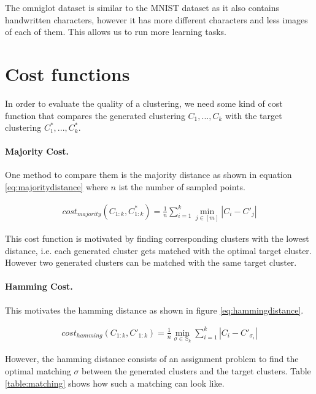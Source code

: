 The omniglot dataset is similar to the MNIST dataset as it also contains handwritten characters, however it has more different characters and less images of each of them. This allows us to run more learning tasks.

\section{Cost functions}
\label{chapter:costfunctions}

In order to evaluate the quality of a clustering, we need some kind of cost function that compares the generated clustering $C_1,...,C_k$ with the target clustering $C_1^*, ..., C_k^*$. 

\paragraph{Majority Cost.} One method to compare them is the majority distance as shown in equation \ref{eq:majoritydistance} where $n$ ist the number of sampled points.

\begin{equation}
    \begin{aligned}
        cost_{majority}(C_{1:k}, C_{1:k}^*) = \frac{1}{n} \sum_{i=1}^k \min_{j \in [m]} |C_i - C'_j|
    \end{aligned}
    \label{eq:majoritydistance}
\end{equation}

This cost function is motivated by finding corresponding clusters with the lowest distance, i.e. each generated cluster gets matched with the optimal target cluster. However two generated clusters can be matched with the same target cluster. 

\paragraph{Hamming  Cost.} This motivates the hamming distance as shown in figure \ref{eq:hammingdistance}.

\begin{equation}
    \begin{aligned}
        cost_{hamming}(C_{1:k}, C'_{1:k}) = \frac{1}{n} \min_{\sigma \in \mathbb{S}_k} \sum_{i=1}^k |C_i - C'_{\sigma_i}|
    \end{aligned}
    \label{eq:hammingdistance}
\end{equation}

However, the hamming distance consists of an assignment problem to find the optimal matching $\sigma$ between the generated clusters and the target clusters. Table \ref{table:matching} shows how such a matching can look like.

